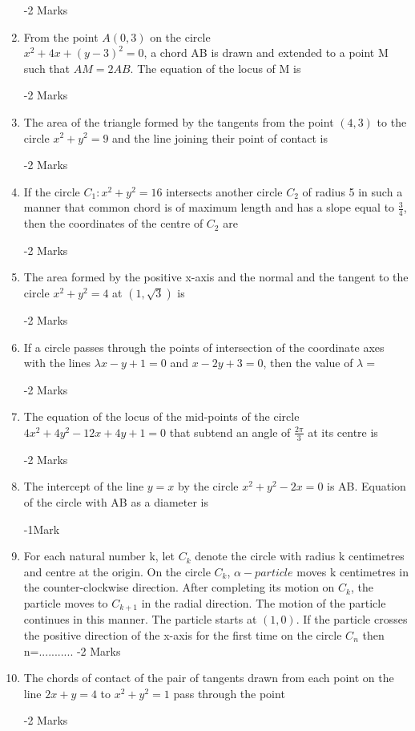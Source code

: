 \documentclass[journal,12pt,twocolumn]{IEEEtran}
\theoremstyle{remark}
\begin{document}
\begin{enumerate}
\hfill{-2 Marks}
\item From the point $A(0,3)$ on the circle \\            $x^{2}+4x+(y-3)^{2}=0$, a chord AB is drawn and extended to a point M such that $AM=2AB$. The equation of the locus of M is \dotuline{\hspace{3cm}}

\hfill{-2 Marks}
\item The area of the triangle formed by the tangents from the point $(4,3)$ to the circle $x^{2}+y^{2}=9$ and the line joining their point of contact is \dotuline{\hspace{3cm}}

\hfill{-2 Marks}
\item If the circle $C_1:x^{2}+y^{2}=16$ intersects another circle $C_2$ of radius 5 in such a manner that common chord is of maximum length and has a slope equal to $\frac{3}{4}$, then the coordinates of the centre of $C_2$ are \dotuline{\hspace{3cm}}

\hfill{-2 Marks}
\item The area formed by the positive x-axis and the normal and the tangent to the circle $x^{2}+y^{2}=4$ at $(1,\sqrt{3})$ is \dotuline{\hspace{3cm}}

\hfill{-2 Marks}
\item If a circle passes through the points of intersection of the coordinate axes with the lines $\lambda x-y+1=0$ and $x-2y+3=0$, then the value of $\lambda =$ \dotuline{\hspace{3cm}}

\hfill{-2 Marks}
\item The equation of the locus of the mid-points of the circle $4x^{2}+4y^{2}-12x+4y+1=0$ that subtend an angle of $\frac{2\pi}{3}$ at its centre is \dotuline{\hspace{3cm}}

\hfill{-2 Marks}
\item The intercept of the line $y=x$ by the circle $x^{2}+y^{2}-2x=0$ is AB. Equation of the circle with AB as a diameter is \dotuline{\hspace{3cm}}

\hfill{-1Mark}
\item For each natural number k, let $C_k$ denote the circle with radius k centimetres and centre at the origin. On the circle $C_k$, $\alpha-particle$ moves k centimetres in the counter-clockwise direction. After completing its motion on $C_k$, the particle moves to $C_{k+1}$ in the radial direction. The motion of the particle continues in this manner. The particle starts at $(1,0)$. If the particle crosses the positive direction of the x-axis for the first time on the circle $C_n$ then n=...........
\hfill{-2 Marks}
\item The chords of contact of the pair of tangents drawn from each point on the line $2x+y=4$ to $x^{2}+y^{2}=1$ pass through the point \dotuline{\hspace{3cm}}

\hfill{-2 Marks}
\end{enumerate}
\end{document}
